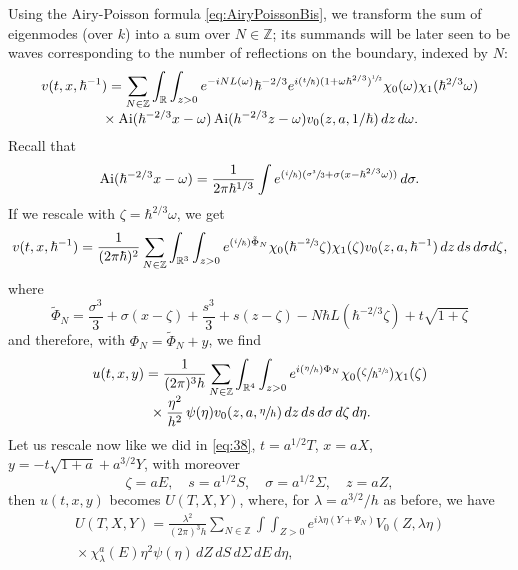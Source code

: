 \documentclass[11pt]{article}
\newcommand{\Psfrac}[2]{(\sfrac{#1}{#2})}
\DeclareMathOperator{\Ai}{Ai}
\newcommand\R{{\mathbb R}}
\newcommand\Z{{\mathbb Z}}
\theoremstyle{plain}
\theoremstyle{definition}
\begin{document}
Using the Airy-Poisson formula \eqref{eq:AiryPoissonBis}, we transform the sum of eigenmodes (over $k$) into a sum over $N\in \Z$; its summands will be later seen to be waves corresponding to the number of reflections on the boundary, indexed by $N$:
\begin{multline*}
v(t,x,\hbar^{-1})= \sum_{N\in \Z} \int_{\R}\int_{{z}>0} e^{-i NL(\omega)} \hbar^{-2/3} e^{i\Psfrac t \hbar (1+\omega \hbar^{2/3})^{\sfrac 1 2}} \chi_{0}(\omega)\chi_{1}(\hbar^{2/3}\omega)\\[
-3pt]
{}\times\Ai(\hbar^{-2/3} x-\omega) \Ai(h^{-2/3}{z}-\omega) v_{0}({z},a,1/\hbar) \,d{z} \,d\omega.
\end{multline*}
Recall that
\begin{equation*}
\label{eq:47}
\Ai(\hbar^{-2/3} x-\omega)=\frac 1 {2\pi \hbar^{1/3} } \int e^{\Psfrac i \hbar (\sfrac{\sigma^{3}}{3}+\sigma(x-\hbar^{2/3}\omega))} \,d\sigma.
\end{equation*}
If we rescale with $\zeta=\hbar^{2/3} \omega$, we get
\begin{equation*}
\label{eq:48}
v(t,x,\hbar^{-1})
= \frac 1 {(2\pi\hbar)^{2}} \sum_{N\in \Z} \int_{\R^{3}}\int_{{z}>0} e^{\Psfrac i \hbar \tilde \Phi_{N}} \chi_{0}(\hbar^{-\sfrac 23}\zeta)\chi_{1}(\zeta) v_{0}({z},a,\hbar^{-1}) \,dz \,ds \,d\sigma d{\zeta},
\end{equation*}
where
\begin{equation*}
\label{eq:49}
\tilde \Phi_{N}=\frac{\sigma^{3}} 3+\sigma(x-\zeta)+\frac {s^{3}} 3+s({z}-\zeta)-N\hbar L(\hbar^{-2/3} \zeta)+t \sqrt{1+\zeta}
\end{equation*}
and therefore, with $\Phi_{N}=\tilde\Phi_{N}+y$, we find
\begin{multline*}
u(t,x,y)
= \frac 1 {(2\pi)^{3}h} \sum_{N\in \Z} \int_{\R^{4}}\int_{{z}>0}e^{i \Psfrac \eta h \Phi_{N}} \chi_{0}(\sfrac {\zeta} {\hbar^{\sfrac 23}})\chi_{1}(\zeta)\\[-5pt]
{}\times\frac {\eta^{2}} {h^{2}}\,{\psi(\eta)} v_{0}({z},a,\sfrac \eta h) \,dz \,ds \,d\sigma \,d\zeta \,d\eta.
\end{multline*}
Let us rescale now like we did in \eqref{eq:38}, $t=a^{1/2} T$, $x=aX$, $y=-t\sqrt{1+a}+a^{3/2}Y$, with moreover
\begin{equation*}
\label{eq:50}
\zeta=a E,\quad s=a^{1/2}S,\quad \sigma =a^{1/2} \Sigma,\quad {z}=a {Z},
\end{equation*}
then $u(t,x,y)$ becomes $U(T,X,Y)$, where, for $\lambda=a^{3/2}/h$ as before, we have
\begin{multline}
\label{eq:51}
U(T,X,Y)= \frac {\lambda^{2}} {(2\pi)^{3}h} \sum_{N\in \Z} \int \int_{Z>0} e^{i\lambda \eta (Y+\Psi_{N})}V_{0}({Z},\lambda \eta) \\[
-3pt]
 {}\times
\chi_{\lambda}^{a}(E) \eta^{2} \psi(\eta) \,dZ \,dS \,d\Sigma \,dE \,d\eta,
\end{multline}
\end{document}
